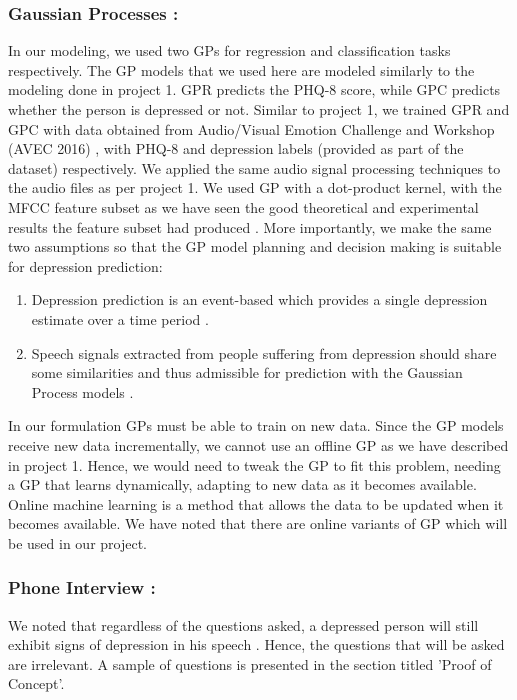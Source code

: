 \documentclass{article}
\begin{document}
    \subsubsection{Gaussian Processes :}
    In our modeling, we used two GPs for regression and classification tasks respectively. 
    The GP models that we used here are modeled similarly to the modeling done in project 1. 
    GPR predicts the PHQ-8 score, while GPC predicts whether the person is depressed or not. 
    Similar to project 1, we trained GPR and GPC with data obtained from Audio/Visual Emotion Challenge and Workshop (AVEC 2016) \cite{avec2016}, with PHQ-8 and depression labels (provided as part of the dataset) respectively. 
    We applied the same audio signal processing techniques to the audio files as per project 1. 
    We used GP with a dot-product kernel, with the MFCC feature subset as we have seen the good theoretical and experimental results the feature subset had produced \cite{cs42462016}. 
    More importantly, we make the same two assumptions so that the GP model planning and decision making is suitable for depression prediction:
    \begin{enumerate}
        \item Depression prediction is an event-based which provides a single depression estimate over a time period \cite{Valstar2016}.
        \item Speech signals extracted from people suffering from depression should share some similarities and thus admissible for prediction with the Gaussian Process models \cite{Cummins2015}.
    \end{enumerate}
In our formulation GPs must be able to train on new data. 
    Since the GP models receive new data incrementally, we cannot use an offline GP as we have described in project 1. 
    Hence, we would need to tweak the GP to fit this problem, needing a GP that learns dynamically, adapting to new data as it becomes available. 
    Online machine learning is a method that allows the data to be updated when it becomes available. 
    We have noted that there are online variants of GP which will be used in our project.
    
    \subsubsection{Phone Interview :}
We noted that regardless of the questions asked, a depressed person will still exhibit signs of depression in his speech \cite{jad2008}. 
    Hence, the questions that will be asked are irrelevant.
    A sample of questions is presented in the section titled 'Proof of Concept'.
\end{document}
